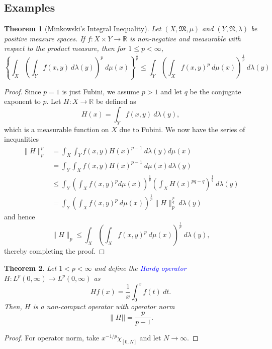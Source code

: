 \documentclass[12pt]{article}
\theoremstyle{thmstyle}
\newtheorem{theorem}{Theorem}[section]
\theoremstyle{defstyle}
\newcommand{\R}{\mathbb{R}}
\newcommand{\frakM}{\mathfrak{M}} %
\newcommand{\frakN}{\mathfrak{N}} %
\newcommand{\define}[1]{\textcolor{blue}{\textit{#1}}}
\renewcommand{\le}{\leqslant}
\begin{document}
\subsection{Examples}

\begin{theorem}[Minkowski's Integral Inequality]
    Let $(X,\frakM, \mu)$ and $(Y,\frakN, \lambda)$ be positive measure spaces. If $f: X\times Y\to\R$ is non-negative and measurable with respect to the product measure, then for $1\le p < \infty$, 
    \begin{equation*}
        \left\{\int_X\left(\int_Y f(x, y)~d\lambda(y)\right)^p~d\mu(x)\right\}^{\frac{1}{p}}\le\int_Y\left(\int_X f(x, y)^p~d\mu(x)\right)^{\frac{1}{p}}~d\lambda(y)
    \end{equation*}
\end{theorem}
\begin{proof}
    Since $p = 1$ is just Fubini, we assume $p > 1$ and let $q$ be the conjugate exponent to $p$. Let $H: X\to\R$ be defined as 
    \begin{equation*}
        H(x) = \int_Y f(x, y)~d\lambda(y),
    \end{equation*}
    which is a measurable function on $X$ due to Fubini. We now have the series of inequalities 
    \begin{align*}
        \|H\|_p^{p} &= \int_X \int_Y f(x,y)H(x)^{p - 1}~d\lambda(y)d\mu(x)\\
        &= \int_Y\int_X f(x, y)H(x)^{p - 1}~d\mu(x)d\lambda(y)\\
        &\le\int_Y\left(\int_X f(x,y)^{p}d\mu(x)\right)^{\frac 1 p}\left(\int_X H(x)^{pq - q}\right)^{\frac 1q}~d\lambda(y)\\
        &= \int_Y\left(\int_Xf(x, y)^p~d\mu(x)\right)^{\frac{1}{p}}\|H\|_p^{\frac pq}~d\lambda(y)
    \end{align*}
    and hence 
    \begin{equation*}
        \|H\|_p\le\int_X\left(\int_X f(x,y)^p~d\mu(x)\right)^{\frac 1p}~d\lambda(y),
    \end{equation*}
    thereby completing the proof.
\end{proof}

\begin{theorem}
    Let $1 < p < \infty$ and define the \define{Hardy operator} $H: L^p(0,\infty)\to L^p(0, \infty)$ as 
    \begin{equation*}
        Hf(x) = \frac{1}{x}\int_0^x f(t)~dt.
    \end{equation*}
    Then, $H$ is a non-compact operator with operator norm 
    \begin{equation*}
        \|H|| = \frac{p}{p - 1}.
    \end{equation*}
\end{theorem}
\begin{proof}
    For operator norm, take $x^{-1/p}\chi_{[0, N]}$ and let $N\to\infty$.
\end{proof}
\end{document}
